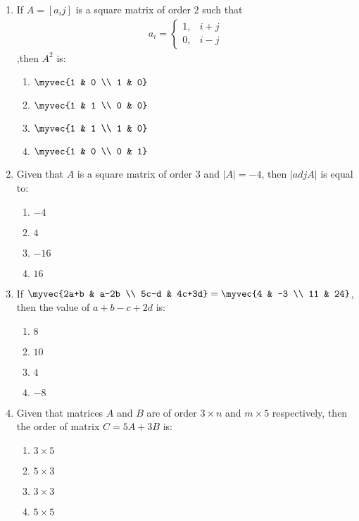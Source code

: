 \documentclass{article}
\begin{document}
\begin{enumerate}
    \item If $A = [a_{i}{j}]$ is a square matrix of order $2$ such that 
    \begin{align}
        a_{i} = \begin{cases}1, & i + j\\0, & i - j
    \end{cases}
    \end{align}
     ,then $A^2$ is:

    \begin{enumerate}
        \item $\myvec{1 & 0 \\ 1 & 0}$
        \item $\myvec{1 & 1 \\ 0 & 0}$
        \item $\myvec{1 & 1 \\ 1 & 0}$
        \item $\myvec{1 & 0 \\ 0 & 1}$
    \end{enumerate}

    \item Given that $A$ is a square matrix of order $3$ and $|A| = -4$, then $| adj A |$ is equal to:
    \begin{enumerate}
        \item $-4$
        \item $4$
        \item $-16$
        \item $16$
    \end{enumerate}
    
    \item If
    $\myvec{2a+b & a-2b \\ 5c-d & 4c+3d} = \myvec{4 & -3 \\ 11 & 24}$, then the value of $a + b - c + 2d$ is:
    \begin{enumerate}
        \item  $8$
        \item $10$
        \item $4$ 
        \item $-8$
    \end{enumerate}

  \item Given that matrices $A$ and $B$ are of order $3 \times n$ and $m \times 5$ respectively, then the order of matrix $C = 5A + 3B$ is:
    \begin{enumerate}
        \item $ 3 \times 5$ 
        \item $ 5 \times 3$ 
        \item $ 3 \times 3$ 
        \item $ 5 \times 5$
    \end{enumerate}


\end{enumerate}
\end{document}
